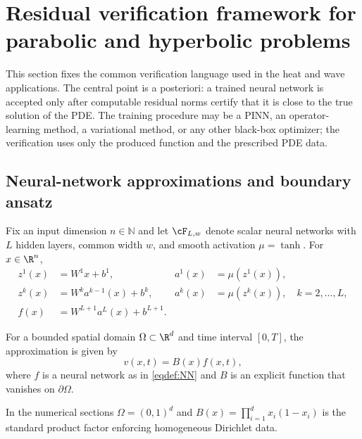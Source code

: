 \section{Residual verification framework for parabolic and hyperbolic problems}\label{sec:NN}

This section fixes the common verification language used in the heat and wave applications.  The central point is a posteriori: a trained neural network is accepted only after computable residual norms certify that it is close to the true solution of the PDE.  The training procedure may be a PINN, an operator-learning method, a variational method, or any other black-box optimizer; the verification uses only the produced function and the prescribed PDE data.

\subsection{Neural-network approximations and boundary ansatz}
Fix an input dimension $n \in \mathbb{N}$ and let $\cF_{L,w}$ denote scalar neural networks with $L$ hidden layers, common width $w$, and smooth activation $\mu=\tanh$. For $x\in\R^n$,
\begin{equation}\label{eqdef:NN}
\begin{aligned}
 z^1(x)&=W^1x+b^1,            & a^1(x)&=\mu(z^1(x)),\\
 z^k(x)&=W^ka^{k-1}(x)+b^k,   & a^k(x)&=\mu(z^k(x)),\quad k=2,\dots,L,\\
 f(x)&=W^{L+1}a^L(x)+b^{L+1}.
\end{aligned}
\end{equation}

\begin{assumption}\label{assumption:NN-bounds}
For a bounded spatial domain $\Omega\subset\R^d$ and time interval $[0,T]$, the approximation is given by
\begin{equation}\label{eq:boundary-ansatz}
    v(x,t)=B(x)f(x,t),
\end{equation}
where $f$ is a neural network as in \eqref{eqdef:NN} and $B$ is an explicit function that vanishes on $\partial\Omega$.
\end{assumption}
In the numerical sections $\Omega=(0,1)^d$ and $B(x)=\prod_{i=1}^d x_i(1-x_i)$ is the standard product factor enforcing homogeneous Dirichlet data.



